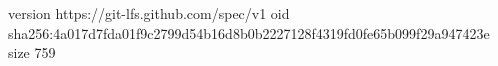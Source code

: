 version https://git-lfs.github.com/spec/v1
oid sha256:4a017d7fda01f9c2799d54b16d8b0b2227128f4319fd0fe65b099f29a947423e
size 759
